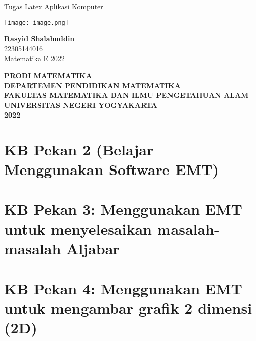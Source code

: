 \documentclass{report}
\begin{document}
\begin{titlepage}
    \begin{center}
        \vspace*{1cm}
        
        \vspace{0.5cm}
        
        \LARGE
        Tugas Latex Aplikasi Komputer  
        
        \vspace{1cm}
        
        \texttt{[image: image.png]}

        \vspace{1cm}
        
        \textbf{Rasyid Shalahuddin}\\
        22305144016\\
        Matematika E 2022
        
        \vspace{2cm}
        
        \Large
        \textbf{PRODI MATEMATIKA}\\
        \textbf{DEPARTEMEN PENDIDIKAN MATEMATIKA}\\
        \textbf{FAKULTAS MATEMATIKA DAN ILMU PENGETAHUAN ALAM}
        \textbf{UNIVERSITAS NEGERI YOGYAKARTA}\\
        \textbf{2022}
        
    \end{center}
\end{titlepage}

\newpage
\tableofcontents{}

\chapter{KB Pekan 2 (Belajar Menggunakan Software EMT)}


\newpage
\chapter{KB Pekan 3: Menggunakan EMT untuk menyelesaikan masalah-masalah Aljabar}


\newpage
\chapter{KB Pekan 4: Menggunakan EMT untuk mengambar grafik 2 dimensi (2D)}

\end{document}
